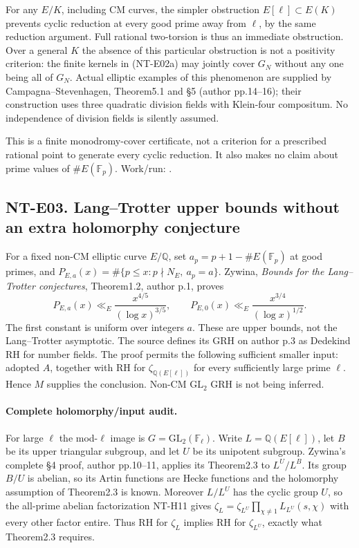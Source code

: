 \documentclass[11pt,a4paper]{article}
\begin{document}
For any $E/K$, including CM curves, the simpler obstruction
$E[\ell]\subset E(K)$ prevents cyclic reduction at every good prime
away from $\ell$, by the same reduction argument. Full rational
two-torsion is thus an immediate obstruction. Over a general $K$
the absence of this particular obstruction is not a positivity
criterion: the finite kernels in (NT-E02a) may jointly cover $G_N$
without any one being all of $G_N$. Actual elliptic examples of this
phenomenon are supplied by Campagna--Stevenhagen, Theorem5.1 and
\S5 (author pp.14--16); their construction uses three quadratic
division fields with Klein-four compositum. No independence of
division fields is silently assumed.

This is a finite monodromy-cover certificate, not a criterion for
a prescribed rational point to generate every cyclic reduction.
It also makes no claim about prime values of $\#E(\mathbb F_p)$.
Work/run: .

\subsection*{NT-E03. Lang--Trotter upper bounds without an extra holomorphy conjecture}
For a fixed non-CM elliptic curve $E/\mathbb Q$, set
$a_p=p+1-\#E(\mathbb F_p)$ at good primes, and
$P_{E,a}(x)=\#\{p\le x:p\nmid N_E,\ a_p=a\}$.
Zywina, \emph{Bounds for the Lang--Trotter conjectures},
Theorem1.2, author p.1, proves
\[
 P_{E,a}(x)\ll_E\frac{x^{4/5}}{(\log x)^{3/5}},\qquad
 P_{E,0}(x)\ll_E\frac{x^{3/4}}{(\log x)^{1/2}}.            \tag{NT-E03a}
\]
The first constant is uniform over integers $a$. These are upper
bounds, not the Lang--Trotter asymptotic. The source defines its GRH
on author p.3 as Dedekind RH for number fields. The proof permits the
following sufficient smaller input: adopted $A$, together with RH
for $\zeta_{\mathbb Q(E[\ell])}$ for every sufficiently large prime
$\ell$. Hence $M$ supplies the conclusion. Non-CM $\mathrm{GL}_2$
GRH is not being inferred.

\paragraph{Complete holomorphy/input audit.}
For large $\ell$ the mod-$\ell$ image is $G=\mathrm{GL}_2(\mathbb F_\ell)$.
Write $L=\mathbb Q(E[\ell])$, let $B$ be its upper triangular
subgroup, and let $U$ be its unipotent subgroup. Zywina's complete
\S4 proof, author pp.10--11, applies its Theorem2.3 to
$L^U/L^B$. Its group $B/U$ is abelian, so its Artin functions are
Hecke functions and the holomorphy assumption of Theorem2.3 is
known. Moreover $L/L^U$ has the cyclic group $U$, so the all-prime
abelian factorization NT-H11 gives
$\zeta_L=\zeta_{L^U}\prod_{\chi\ne1}L_{L^U}(s,\chi)$ with every
other factor entire. Thus RH for $\zeta_L$ implies RH for
$\zeta_{L^U}$, exactly what Theorem2.3 requires.
\end{document}
